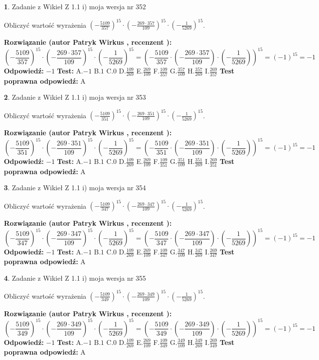\documentclass[12pt, a4paper]{article}
\theoremstyle{definition} %
\newtheorem{zad}{}
\newcommand{\zadStart}[1]{\begin{zad}#1\newline}
\newcommand{\zadStop}{\end{zad}}
\newcommand{\rozwStart}[2]{\noindent \textbf{Rozwiązanie (autor #1 , recenzent #2): }\newline}
\newcommand{\rozwStop}{\newline}
\newcommand{\odpStart}{\noindent \textbf{Odpowiedź:}\newline}
\newcommand{\odpStop}{\newline}
\newcommand{\testStart}{\noindent \textbf{Test:}\newline}
\newcommand{\testStop}{\newline}
\newcommand{\kluczStart}{\noindent \textbf{Test poprawna odpowiedź:}\newline}
\newcommand{\kluczStop}{\newline}
\begin{document}
\zadStart{Zadanie z Wikieł Z 1.1 i) moja wersja nr 352}

Obliczyć wartość wyrażenia $(-\frac{5109}{357})^{15} \cdot (-\frac{269 \cdot 357}{109})^{15} \cdot (-\frac{1}{5269})^{15}$.
\zadStop
\rozwStart{Patryk Wirkus}{}
$$(-\frac{5109}{357})^{15} \cdot (-\frac{269 \cdot 357}{109})^{15} \cdot (-\frac{1}{5269})^{15} = (-\frac{5109}{357} \cdot (-\frac{269 \cdot 357}{109}) \cdot (-\frac{1}{5269}))^{15} = (-1)^{15} = -1$$
\rozwStop
\odpStart
$-1$
\odpStop
\testStart
A.$-1$ B.$1$ C.$0$ D.$\frac{109}{269}$ E.$\frac{269}{109}$
F.$\frac{109}{357}$ G.$\frac{357}{109}$
H.$\frac{357}{269}$
I.$\frac{269}{357}$
\testStop
\kluczStart
A
\kluczStop



\zadStart{Zadanie z Wikieł Z 1.1 i) moja wersja nr 353}

Obliczyć wartość wyrażenia $(-\frac{5109}{351})^{15} \cdot (-\frac{269 \cdot 351}{109})^{15} \cdot (-\frac{1}{5269})^{15}$.
\zadStop
\rozwStart{Patryk Wirkus}{}
$$(-\frac{5109}{351})^{15} \cdot (-\frac{269 \cdot 351}{109})^{15} \cdot (-\frac{1}{5269})^{15} = (-\frac{5109}{351} \cdot (-\frac{269 \cdot 351}{109}) \cdot (-\frac{1}{5269}))^{15} = (-1)^{15} = -1$$
\rozwStop
\odpStart
$-1$
\odpStop
\testStart
A.$-1$ B.$1$ C.$0$ D.$\frac{109}{269}$ E.$\frac{269}{109}$
F.$\frac{109}{351}$ G.$\frac{351}{109}$
H.$\frac{351}{269}$
I.$\frac{269}{351}$
\testStop
\kluczStart
A
\kluczStop



\zadStart{Zadanie z Wikieł Z 1.1 i) moja wersja nr 354}

Obliczyć wartość wyrażenia $(-\frac{5109}{347})^{15} \cdot (-\frac{269 \cdot 347}{109})^{15} \cdot (-\frac{1}{5269})^{15}$.
\zadStop
\rozwStart{Patryk Wirkus}{}
$$(-\frac{5109}{347})^{15} \cdot (-\frac{269 \cdot 347}{109})^{15} \cdot (-\frac{1}{5269})^{15} = (-\frac{5109}{347} \cdot (-\frac{269 \cdot 347}{109}) \cdot (-\frac{1}{5269}))^{15} = (-1)^{15} = -1$$
\rozwStop
\odpStart
$-1$
\odpStop
\testStart
A.$-1$ B.$1$ C.$0$ D.$\frac{109}{269}$ E.$\frac{269}{109}$
F.$\frac{109}{347}$ G.$\frac{347}{109}$
H.$\frac{347}{269}$
I.$\frac{269}{347}$
\testStop
\kluczStart
A
\kluczStop



\zadStart{Zadanie z Wikieł Z 1.1 i) moja wersja nr 355}

Obliczyć wartość wyrażenia $(-\frac{5109}{349})^{15} \cdot (-\frac{269 \cdot 349}{109})^{15} \cdot (-\frac{1}{5269})^{15}$.
\zadStop
\rozwStart{Patryk Wirkus}{}
$$(-\frac{5109}{349})^{15} \cdot (-\frac{269 \cdot 349}{109})^{15} \cdot (-\frac{1}{5269})^{15} = (-\frac{5109}{349} \cdot (-\frac{269 \cdot 349}{109}) \cdot (-\frac{1}{5269}))^{15} = (-1)^{15} = -1$$
\rozwStop
\odpStart
$-1$
\odpStop
\testStart
A.$-1$ B.$1$ C.$0$ D.$\frac{109}{269}$ E.$\frac{269}{109}$
F.$\frac{109}{349}$ G.$\frac{349}{109}$
H.$\frac{349}{269}$
I.$\frac{269}{349}$
\testStop
\kluczStart
A
\kluczStop
\end{document}
